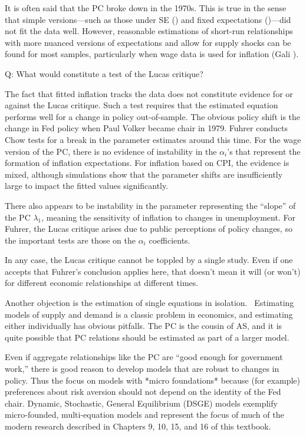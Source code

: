 ﻿\documentclass[oneside]{book}
\begin{document}
It is often said that the PC broke down in the 1970s. This is true in the sense that simple versions---such as those under SE () and fixed expectations ()---did not fit the data well. However, reasonable estimations of short-run relationships with more nuanced versions of expectations and allow for supply shocks can be found for most
samples, particularly when wage data is used for inflation (Gali ).

Q: What would constitute a test of the Lucas critique?

The fact that fitted inflation tracks the data does not constitute evidence
for or against the Lucas critique. Such a test requires that the estimated
equation performs well for a change in policy out-of-sample. The obvious
policy shift is the change in Fed policy when Paul Volker became chair in
1979. Fuhrer conducts Chow tests for a break in the parameter estimates
around this time. For the wage version of the PC, there is no evidence of
instability in the $\alpha _{i}$'s that represent the formation of inflation
expectations. For inflation based on CPI, the evidence is mixed, although
simulations show that the parameter shifts are insufficiently large to impact
the fitted values significantly.

There also appears to be instability in the parameter representing the
``slope'' of the PC $\lambda _{1}$, meaning the sensitivity of inflation to
changes in unemployment. For Fuhrer, the Lucas critique arises due
to public perceptions of policy changes, so the important tests are those on the $\alpha _{i}$
coefficients.

In any case, the Lucas critique cannot be toppled by a single study. Even if one accepts that Fuhrer's conclusion applies here, that doesn't mean it will (or won't) for different economic relationships at different times.

Another objection is the estimation of single equations in isolation. \
Estimating models of supply and demand is a classic problem in economics,
and estimating either individually has obvious pitfalls. The PC is the
cousin of AS, and it is quite possible that PC relations should be estimated as part of a larger model.

Even if aggregate relationships like the PC are ``good enough for government
work,'' there is good reason to develop models that are robust to changes in
policy. Thus the focus on models with *micro foundations* because
(for example) preferences about risk aversion should not depend on the
identity of the Fed chair. Dynamic, Stochastic, General Equilibrium (DSGE)
models exemplify micro-founded, multi-equation models and represent the focus of much of the modern research described in Chapters 9, 10, 15, and 16 of this textbook.
\end{document}
